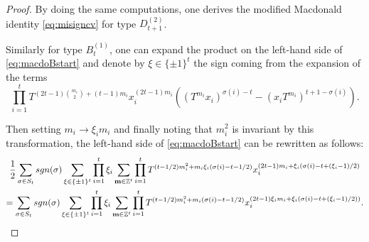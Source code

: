 \documentclass[10pt,a4paper]{amsart}
\def\bbbz{\mathbb Z}
\def\sgn{{\rm sgn}}
\begin{document}
\begin{proof}
By doing the same computations, one derives the modified Macdonald identity \eqref{eq:misigncv} for type $D_{t+1}^{(2)}$.

%







\noindent  Similarly for type $B_t^{(1)}$, one can expand the product on the left-hand side of \eqref{eq:macdoBstart} and denote by $\xi\in\lbrace \pm 1\rbrace^t$ the sign coming from the expansion of the terms $$\prod_{i=1}^t T^{(2t-1)\binom{m_i}{2}+(t-1)m_i}x_i^{(2t-1)m_i}\left((T^{m_i}x_i)^{\sigma(i)-t}-(x_iT^{m_i})^{t+1-\sigma(i)}\right).$$

\noindent Then setting $m_i\to \xi_i m_i$ and finally noting that $m_i^2$ is invariant by this transformation, the left-hand side of \eqref{eq:macdoBstart} can be rewritten as follows:
\begin{multline*}
\frac{1}{2}\sum_{\sigma\in S_t}\sgn(\sigma) \sum_{\xi\in\lbrace \pm 1\rbrace^t}\prod_{i=1}^t \xi_i \sum_{\mathbf{m}\in\bbbz^t}\prod_{i=1}^t T^{(t-1/2)m_i^2+m_i \xi_i(\sigma(i)-t-1/2)} x_i^{(2t-1)m_i+\xi_i(\sigma(i)-t+(\xi_i-1)/2)}\\
=\sum_{\sigma\in S_t}\sgn(\sigma) \sum_{\xi\in\lbrace \pm 1\rbrace^t}\prod_{i=1}^t \xi_i\sum_{\mathbf{m}\in\bbbz^t}\prod_{i=1}^t  T^{(t-1/2)m_i^2+m_i(\sigma(i)-t-1/2)} x_i^{(2t-1)\xi_im_i+\xi_i(\sigma(i)-t+(\xi_i-1)/2))}.
\end{multline*}


\end{proof}
\end{document}

